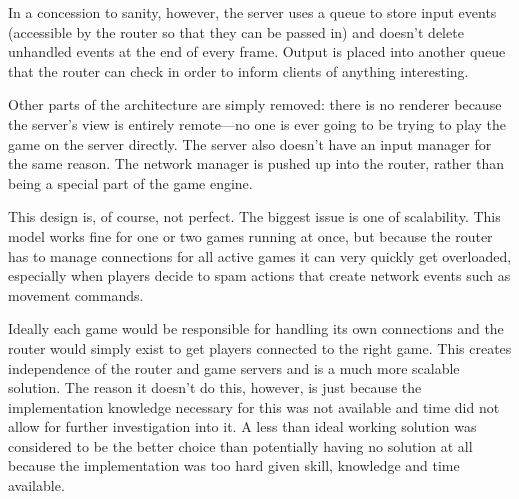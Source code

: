 In a concession to sanity, however, the server uses a queue to store input events (accessible by the router so that they can be passed in) and doesn't delete unhandled events at the end of every frame. Output is placed into another queue that the router can check in order to inform clients of anything interesting.

Other parts of the architecture are simply removed: there is no renderer because the server's view is entirely remote---no one is ever going to be trying to play the game on the server directly. The server also doesn't have an input manager for the same reason. The network manager is pushed up into the router, rather than being a special part of the game engine.

This design is, of course, not perfect. The biggest issue is one of scalability. This model works fine for one or two games running at once, but because the router has to manage connections for all active games it can very quickly get overloaded, especially when players decide to spam actions that create network events such as movement commands.

Ideally each game would be responsible for handling its own connections and the router would simply exist to get players connected to the right game. This creates independence of the router and game servers and is a much more scalable solution. The reason it doesn't do this, however, is just because the implementation knowledge necessary for this was not available and time did not allow for further investigation into it. A less than ideal working solution was considered to be the better choice than potentially having no solution at all because the implementation was too hard given skill, knowledge and time available.




